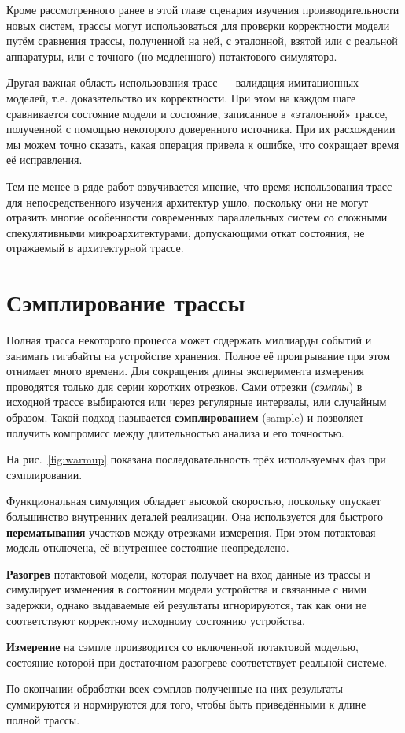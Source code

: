 Кроме рассмотренного ранее в этой главе сценария изучения производительности новых систем, трассы могут использоваться для проверки корректности модели путём сравнения трассы, полученной на ней, с эталонной, взятой или с реальной аппаратуры, или с точного (но медленного) потактового симулятора.

Другая важная область использования трасс --- валидация имитационных моделей, т.е. доказательство их корректности. При этом на каждом шаге сравнивается состояние модели и состояние, записанное в «эталонной» трассе, полученной с помощью некоторого доверенного источника. При их расхождении мы можем точно сказать, какая операция привела к ошибке, что сокращает время её исправления.

Тем не менее в ряде работ озвучивается мнение, что время использования трасс для непосредственного изучения архитектур ушло, поскольку они не могут отразить многие особенности современных параллельных систем со сложными спекулятивными микроархитектурами, допускающими откат состояния, не отражаемый в архитектурной трассе.

\section{Сэмплирование трассы}

Полная трасса некоторого процесса может содержать миллиарды событий и занимать гигабайты на устройстве хранения. Полное её проигрывание при этом отнимает много времени. Для сокращения длины эксперимента измерения проводятся только для серии коротких отрезков. Сами отрезки (\textit{сэмплы}) в исходной трассе выбираются или через регулярные интервалы, или случайным образом. Такой подход называется \textbf{сэмплированием} (\abbr sample) и позволяет получить компромисс между длительностью анализа и его точностью.

На рис.~\ref{fig:warmup} показана последовательность трёх используемых фаз при сэмплировании.
\begin{itemize*}
    \item Функциональная симуляция обладает высокой скоростью, поскольку опускает большинство внутренних деталей реализации. Она используется для быстрого \textbf{перематывания} участков между отрезками измерения. При этом потактовая модель отключена, её внутреннее состояние неопределено.
    \item \textbf{Разогрев} потактовой модели, которая получает на вход данные из трассы и симулирует изменения в состоянии модели устройства и связанные с ними задержки,  однако выдаваемые ей результаты игнорируются, так как они не соответствуют корректному исходному состоянию устройства. 
    \item \textbf{Измерение} на сэмпле производится со включенной потактовой моделью, состояние которой при достаточном разогреве соответствует реальной системе.
    \item По окончании обработки всех сэмплов полученные на них результаты суммируются и нормируются для  того, чтобы быть приведёнными к длине полной трассы.
\end{itemize*}

